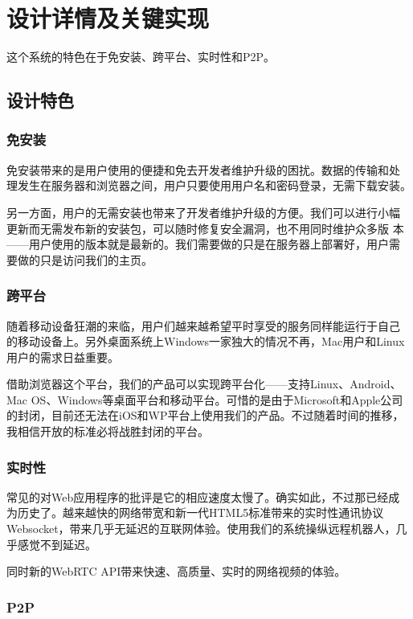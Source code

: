 \chapter{设计详情及关键实现}

这个系统的特色在于免安装、跨平台、实时性和P2P。

\section{设计特色}

\subsection{免安装}

免安装带来的是用户使用的便捷和免去开发者维护升级的困扰。数据的传输和处
理发生在服务器和浏览器之间，用户只要使用用户名和密码登录，无需下载安装。

另一方面，用户的无需安装也带来了开发者维护升级的方便。我们可以进行小幅
更新而无需发布新的安装包，可以随时修复安全漏洞，也不用同时维护众多版
本——用户使用的版本就是最新的。我们需要做的只是在服务器上部署好，用户需
要做的只是访问我们的主页。

\subsection{跨平台}

随着移动设备狂潮的来临，用户们越来越希望平时享受的服务同样能运行于自己
的移动设备上。另外桌面系统上Windows一家独大的情况不再，Mac用户和Linux
用户的需求日益重要。

借助浏览器这个平台，我们的产品可以实现跨平台化——支持Linux、Android、
Mac OS、Windows等桌面平台和移动平台。可惜的是由于Microsoft和Apple公司
的封闭，目前还无法在iOS和WP平台上使用我们的产品。不过随着时间的推移，
我相信开放的标准必将战胜封闭的平台。

\subsection{实时性}

常见的对Web应用程序的批评是它的相应速度太慢了。确实如此，不过那已经成
为历史了。越来越快的网络带宽和新一代HTML5标准带来的实时性通讯协议
Websocket，带来几乎无延迟的互联网体验。使用我们的系统操纵远程机器人，几
乎感觉不到延迟。

同时新的WebRTC API带来快速、高质量、实时的网络视频的体验。

\subsection{P2P}


